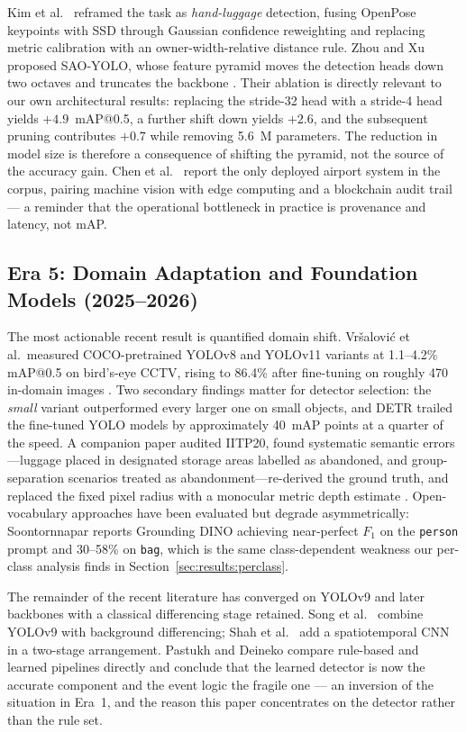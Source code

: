 \documentclass[10pt,twocolumn,a4paper]{article}
\begin{document}
Kim et al.\ \cite{kim2022hldnet} reframed the task as \emph{hand-luggage} detection, fusing OpenPose
keypoints with SSD through Gaussian confidence reweighting and replacing metric
calibration with an owner-width-relative distance rule. Zhou and Xu proposed
SAO-YOLO, whose feature pyramid moves the detection heads down two octaves and
truncates the backbone \cite{zhou2024sao}. Their ablation is directly relevant to
our own architectural results: replacing the stride-32 head with a stride-4 head
yields $+4.9$~mAP@0.5, a further shift down yields $+2.6$, and the subsequent
pruning contributes $+0.7$ while removing 5.6~M parameters. The reduction in model
size is therefore a consequence of shifting the pyramid, not the source of the
accuracy gain. Chen et al.\
\cite{chen2024airport} report the only deployed airport system in the corpus,
pairing machine vision with edge computing and a blockchain audit trail --- a
reminder that the operational bottleneck in practice is provenance and latency,
not mAP.

\subsection{Era 5: Domain Adaptation and Foundation Models (2025--2026)}

The most actionable recent result is quantified domain shift.
Vr\v{s}alovi\'{c} et al.\ measured COCO-pretrained YOLOv8 and YOLOv11 variants at
1.1--4.2\% mAP@0.5 on bird's-eye CCTV, rising to 86.4\% after fine-tuning on
roughly 470 in-domain images \cite{vrsalovic2025sensors}. Two secondary findings
matter for detector selection: the \emph{small} variant outperformed every larger
one on small objects, and DETR trailed the fine-tuned YOLO models by approximately
40~mAP points at a quarter of the speed. A companion paper audited IITP20, found
systematic semantic errors---luggage placed in designated storage areas labelled
as abandoned, and group-separation scenarios treated as abandonment---re-derived
the ground truth, and replaced the fixed pixel radius with a monocular metric
depth estimate \cite{vrsalovic2025picom}. Open-vocabulary approaches have been
evaluated but degrade asymmetrically: Soontornnapar \cite{soontornnapar2025}
reports Grounding DINO achieving near-perfect $F_1$ on the \texttt{person} prompt
and 30--58\% on \texttt{bag}, which is the same class-dependent weakness our
per-class analysis finds in Section~\ref{sec:results:perclass}.

The remainder of the recent literature has converged on YOLOv9 and later
backbones with a classical differencing stage retained. Song et al.\
\cite{song2025yolov9} combine YOLOv9 with background differencing; Shah et al.\
\cite{shah2026} add a spatiotemporal CNN in a two-stage arrangement. Pastukh and Deineko \cite{pastukh2026} compare
rule-based and learned pipelines directly and conclude that the learned detector
is now the accurate component and the event logic the fragile one --- an
inversion of the situation in Era~1, and the reason this paper concentrates on
the detector rather than the rule set.
\end{document}
